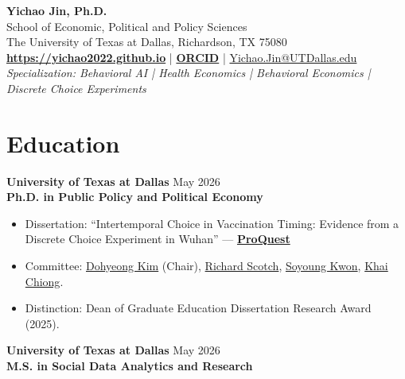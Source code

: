 \documentclass[11pt, letterpaper]{article}
\begin{document}
\thispagestyle{empty}
\pagestyle{empty}

\begin{center}
    {\huge \textbf{Yichao Jin, Ph.D.}} \\
    \vspace{0.5em}
    School of Economic, Political and Policy Sciences \\
    The University of Texas at Dallas, Richardson, TX 75080 \\
    \vspace{0.5em}
    \href{https://yichao2022.github.io}{\textbf{https://yichao2022.github.io}} \quad | \quad \href{https://orcid.org/0009-0003-7667-5143}{\textbf{ORCID}} \quad | \quad \href{mailto:Yichao.Jin@UTDallas.edu}{Yichao.Jin@UTDallas.edu} \\
    \vspace{0.5em}
    \textit{Specialization: Behavioral AI \;|\; Health Economics \;|\; Behavioral Economics \;|\; Discrete Choice Experiments}
\end{center}

\vspace{0.5em}
\noindent\hrulefill

\section*{Education}
\textbf{University of Texas at Dallas} \hfill May 2026 \\
\textbf{Ph.D. in Public Policy and Political Economy}
\begin{itemize}[noitemsep, topsep=0pt, label={-}]
    \item Dissertation: ``Intertemporal Choice in Vaccination Timing: Evidence from a Discrete Choice Experiment in Wuhan'' --- \href{https://www.proquest.com/docview/3354986484}{\textbf{ProQuest}}
    \item Committee: \href{https://profiles.utdallas.edu/dohyeong.kim}{Dohyeong Kim} (Chair), \href{https://profiles.utdallas.edu/richard.scotch}{Richard Scotch}, \href{https://profiles.utdallas.edu/soyoung.kwon}{Soyoung Kwon}, \href{https://jindal.utdallas.edu/faculty/khai-chiong/}{Khai Chiong}.
    \item Distinction: Dean of Graduate Education Dissertation Research Award (2025).
\end{itemize}

\vspace{0.5em}
\noindent \textbf{University of Texas at Dallas} \hfill May 2026 \\
\textbf{M.S. in Social Data Analytics and Research}
\end{document}
